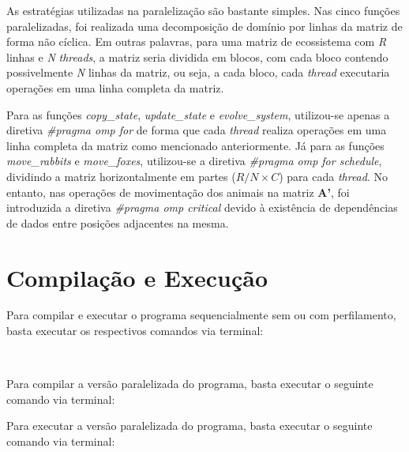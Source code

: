 \documentclass[a4paper, 12pt]{article}
\begin{document}
As estratégias utilizadas na paralelização são bastante simples. Nas cinco funções paralelizadas, foi realizada uma decomposição de domínio por linhas da matriz de forma não cíclica. Em outras palavras, para uma matriz de ecossistema com \emph{R} linhas e \emph{N} \emph{threads}, a matriz seria dividida em blocos, com cada bloco contendo possivelmente \emph{N} linhas da matriz, ou seja, a cada bloco, cada \emph{thread} executaria operações em uma linha completa da matriz.

Para as funções \emph{copy\_state}, \emph{update\_state} e \emph{evolve\_system}, utilizou-se apenas a diretiva \textit{\#pragma omp for} de forma que cada \emph{thread} realiza operações em uma linha completa da matriz como mencionado anteriormente. Já para as funções \emph{move\_rabbits} e \emph{move\_foxes}, utilizou-se a diretiva \textit{\#pragma omp for schedule}, dividindo a matriz horizontalmente em partes (\(R / N \times C\)) para cada \emph{thread}. No entanto, nas operações de movimentação dos animais na matriz \textbf{A'}, foi introduzida a diretiva \textit{\#pragma omp critical} devido à existência de dependências de dados entre posições adjacentes na mesma.

\section{Compilação e Execução}

\noindent Para compilar e executar o programa sequencialmente sem ou com perfilamento, basta executar os respectivos comandos via terminal:

\begin{center}
    \\
    \vspace{0.5cm}
\end{center}

\noindent Para compilar a versão paralelizada do programa, basta executar o seguinte comando via terminal:

\begin{center}
\end{center}

\noindent Para executar a versão paralelizada do programa, basta executar o seguinte comando via terminal:

\begin{center}
    \\
\end{center}
\end{document}
